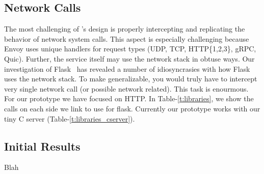 \begin{table}[!ht]
    \begin{center}
        \caption{Library Functions Linked (Tiny C Webserver only)}
        \label{t:libraries_cserver}
    \end{center}
\end{table}

\subsection{\sysname Network Calls}
The most challenging of \sysname's design is properly intercepting and replicating the behavior of network system calls.
This aspect is especially challenging because Envoy uses unique handlers for request types (UDP, TCP, HTTP\{1,2,3\}, gRPC, Quic).
Further, the service itself may use the network stack in obtuse ways.
Our investigation of Flask~\cite{flask} has revealed a number of idiosyncrasies with how Flask uses the network stack.
To make \sysname generalizable, you would truly have to intercept very single network call (or possible network related).
This task is enourmous.
For our prototype we have focused on HTTP.
In Table-\ref{t:libraries}, we show the calls on each side we link to use \sysname for flask.
Currently our prototype works with our tiny C server (Table-\ref{t:libraries_cserver}).

\subsection{Initial Results}
Blah


